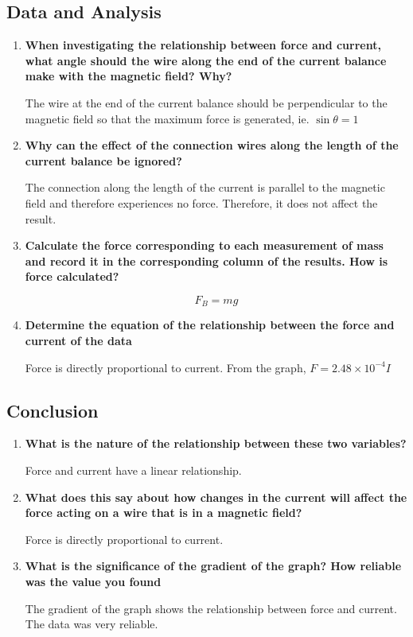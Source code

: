 	\subsection{Data and Analysis}
		\begin{enumerate}
			\item \textbf{When investigating the relationship between force and current, what angle should the wire along the end of the current balance make with the magnetic field? Why?}

				The wire at the end of the current balance should be perpendicular to the magnetic field so that the maximum force is generated, ie. $\sin{\theta}=1$

			\item \textbf{Why can the effect of the connection wires along the length of the current balance be ignored?}
				
				The connection along the length of the current is parallel to the magnetic field and therefore experiences no force. Therefore, it does not affect the result.

			\item \textbf{Calculate the force corresponding to each measurement of mass and record it in the corresponding column of the results. How is force calculated?}
				
				$$F_B = mg$$

			\item \textbf{Determine the equation of the relationship between the force and current of the data}

				Force is directly proportional to current. From the graph, $F = 2.48 \times 10^{-4} I$
		
		\end{enumerate}
	
	\subsection{Conclusion}
		\begin{enumerate}
			\item \textbf{What is the nature of the relationship between these two variables?}

				Force and current have a linear relationship.

			\item \textbf{What does this say about how changes in the current will affect the force acting on a wire that is in a magnetic field?}

				Force is directly proportional to current.

			\item \textbf{What is the significance of the gradient of the graph? How reliable was the value you found}

				The gradient of the graph shows the relationship between force and current. The data was very reliable.

		\end{enumerate}
